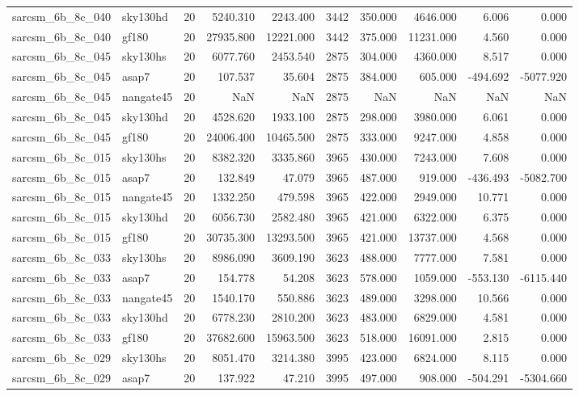 \documentclass{article}
\begin{document}
\begin{longtable}{llrrrrrrrr}
sarcsm\_6b\_8c\_040 & sky130hd & 20 & 5240.310 & 2243.400 & 3442 & 350.000 & 4646.000 & 6.006 & 0.000 \\
sarcsm\_6b\_8c\_040 & gf180 & 20 & 27935.800 & 12221.000 & 3442 & 375.000 & 11231.000 & 4.560 & 0.000 \\
sarcsm\_6b\_8c\_045 & sky130hs & 20 & 6077.760 & 2453.540 & 2875 & 304.000 & 4360.000 & 8.517 & 0.000 \\
sarcsm\_6b\_8c\_045 & asap7 & 20 & 107.537 & 35.604 & 2875 & 384.000 & 605.000 & -494.692 & -5077.920 \\
sarcsm\_6b\_8c\_045 & nangate45 & 20 & NaN & NaN & 2875 & NaN & NaN & NaN & NaN \\
sarcsm\_6b\_8c\_045 & sky130hd & 20 & 4528.620 & 1933.100 & 2875 & 298.000 & 3980.000 & 6.061 & 0.000 \\
sarcsm\_6b\_8c\_045 & gf180 & 20 & 24006.400 & 10465.500 & 2875 & 333.000 & 9247.000 & 4.858 & 0.000 \\
sarcsm\_6b\_8c\_015 & sky130hs & 20 & 8382.320 & 3335.860 & 3965 & 430.000 & 7243.000 & 7.608 & 0.000 \\
sarcsm\_6b\_8c\_015 & asap7 & 20 & 132.849 & 47.079 & 3965 & 487.000 & 919.000 & -436.493 & -5082.700 \\
sarcsm\_6b\_8c\_015 & nangate45 & 20 & 1332.250 & 479.598 & 3965 & 422.000 & 2949.000 & 10.771 & 0.000 \\
sarcsm\_6b\_8c\_015 & sky130hd & 20 & 6056.730 & 2582.480 & 3965 & 421.000 & 6322.000 & 6.375 & 0.000 \\
sarcsm\_6b\_8c\_015 & gf180 & 20 & 30735.300 & 13293.500 & 3965 & 421.000 & 13737.000 & 4.568 & 0.000 \\
sarcsm\_6b\_8c\_033 & sky130hs & 20 & 8986.090 & 3609.190 & 3623 & 488.000 & 7777.000 & 7.581 & 0.000 \\
sarcsm\_6b\_8c\_033 & asap7 & 20 & 154.778 & 54.208 & 3623 & 578.000 & 1059.000 & -553.130 & -6115.440 \\
sarcsm\_6b\_8c\_033 & nangate45 & 20 & 1540.170 & 550.886 & 3623 & 489.000 & 3298.000 & 10.566 & 0.000 \\
sarcsm\_6b\_8c\_033 & sky130hd & 20 & 6778.230 & 2810.200 & 3623 & 483.000 & 6829.000 & 4.581 & 0.000 \\
sarcsm\_6b\_8c\_033 & gf180 & 20 & 37682.600 & 15963.500 & 3623 & 518.000 & 16091.000 & 2.815 & 0.000 \\
sarcsm\_6b\_8c\_029 & sky130hs & 20 & 8051.470 & 3214.380 & 3995 & 423.000 & 6824.000 & 8.115 & 0.000 \\
sarcsm\_6b\_8c\_029 & asap7 & 20 & 137.922 & 47.210 & 3995 & 497.000 & 908.000 & -504.291 & -5304.660 \\

\end{longtable}
\end{document}
